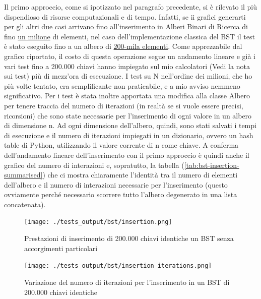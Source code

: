 \documentclass{article}
\begin{document}
Il primo approccio, come si ipotizzato nel paragrafo precedente, si è rilevato il più dispendioso di risorse computazionali e di tempo. Infatti, se ii grafici generarti per gli altri due casi arrivano fino all'inserimento in Alberi Binari di Ricerca di fino \underline{un milione} di elementi, nel caso dell'implementazione classica del BST il test è stato eseguito fino a un albero di \underline{200-mila elementi}. Come apprezzabile dal grafico riportato, il costo di questa operazione segue un andamento lineare e già i vari test fino a 200.000 chiavi hanno impiegato sul mio calcolatori (Vedi la nota sui test) più di mezz'ora di esecuzione. I test su N nell'ordine dei milioni, che ho più volte tentato, era semplificante non praticabile, e a mio avviso nemmeno significativo. Per i test è stata inoltre apportata una modifica alla classe Albero per tenere traccia del numero di iterazioni (in realtà se si vuole essere precisi, ricorsioni) che sono state necessarie per l'inserimento di ogni valore in un albero di dimensione n. Ad ogni dimensione dell'albero, quindi, sono stati salvati i tempi di esecuzione e il numero di iterazioni impiegati in un dizionario, ovvero un hash table di Python, utilizzando il valore corrente di n come chiave.
A conferma dell'andamento lineare dell'inserimento con il primo approccio è quindi anche il grafico del numero di interazioni e, sopratutto, la tabella (\ref{tab:bst-insertion-summarised}) che ci mostra chiaramente l'identità tra il numero di elementi dell'albero e il numero di interazioni necessarie per l'inserimento (questo ovviamente perché necessario scorrere tutto l'albero degenerato in una lista concatenata).


\begin{figure}[htbp]
 \begin{minipage}{0.5\textwidth}
    \centering
    \texttt{[image: ./tests\_output/bst/insertion.png]}
    \caption{Prestazioni di inserimento di 200.000 chiavi identiche un BST senza accorgimenti particolari}
    \label{fig:bst-normal-insetion}
  \end{minipage}
    \hspace{0.05\textwidth}
  \begin{minipage}{0.5\textwidth}
    \centering
    \texttt{[image: ./tests\_output/bst/insertion\_iterations.png]}
    \caption{Variazione del numero di iterazioni per l'inserimento in un BST di 200.000 chiavi identiche}
    \label{fig:bst-normal-insetion-iterations}
  \end{minipage}%
\end{figure}
\end{document}
